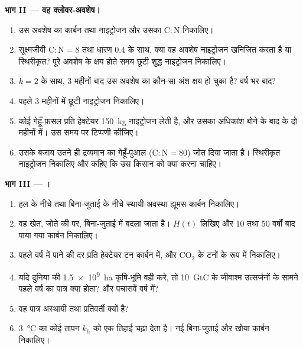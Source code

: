 \begin{problem}
\medskip
\noindent\textbf{भाग II --- वह क्लोवर-अवशेष।}
\begin{enumerate}[resume]
  \item उस अवशेष का कार्बन तथा नाइट्रोजन और उसका
        $\mathrm{C:N}$ निकालिए।
  \item सूक्ष्मजीवी $\mathrm{C:N} = 8$ तथा धारण $0.4$ के साथ, क्या
        वह अवशेष नाइट्रोजन खनिजित करता है या स्थिरीकृत? पूरे अवशेष के क्षय होते समय
        छूटी शुद्ध नाइट्रोजन निकालिए।
  \item $k = 2$ के साथ, 3 महीनों बाद उस अवशेष का कौन-सा अंश क्षय हो चुका है?
        वर्ष भर बाद?
  \item पहले 3 महीनों में छूटी नाइट्रोजन निकालिए।
  \item कोई गेहूँ-फ़सल प्रति हेक्टेयर \qty{150}{kg} नाइट्रोजन लेती है,
        और उसका अधिकांश बोने के बाद के दो महीनों में। उस समय पर टिप्पणी कीजिए।
  \item उसके बजाय उतने ही द्रव्यमान का गेहूँ-पुआल ($\mathrm{C:N} = 80$)
        जोत दिया जाता है। स्थिरीकृत नाइट्रोजन निकालिए और
        कहिए कि उस किसान को क्या करना चाहिए।
\end{enumerate}

\medskip
\noindent\textbf{भाग III --- ।}
\begin{enumerate}[resume]
  \item हल के नीचे तथा बिना-जुताई के नीचे स्थायी-अवस्था ह्यूमस-कार्बन
        निकालिए।
  \item वह खेत, जोते की  पर, बिना-जुताई में बदला जाता है।
        $H(t)$ लिखिए और 10 तथा 50 वर्षों बाद पाया गया कार्बन
        निकालिए।
  \item पहले वर्ष में पाने की दर प्रति हेक्टेयर टन
        कार्बन में, और $\mathrm{CO_2}$ के टनों के रूप में निकालिए।
  \item यदि दुनिया की \qty{1.5e9}{ha} कृषि-भूमि वही करे, तो
        \qty{10}{GtC} के जीवाश्म उत्सर्जनों के सामने पहले वर्ष का पात्र
        क्या होता? और पचासवें वर्ष में?
  \item वह पात्र अस्थायी तथा प्रतिवर्ती क्यों है?
  \item \qty{3}{\celsius} का कोई तापन $k_h$ को एक तिहाई चढ़ा देता है।
        नई बिना-जुताई  और खोया कार्बन निकालिए।
\end{enumerate}


\end{problem}
